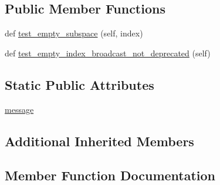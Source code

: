 \subsection*{Public Member Functions}
\begin{DoxyCompactItemize}
\item 
def \hyperlink{classnumpy_1_1core_1_1tests_1_1test__deprecations_1_1TestIncorrectAdvancedIndexWithEmptyResult_af973ee4d2cab6b1620e0ed1547ecb5d1}{test\+\_\+empty\+\_\+subspace} (self, index)
\item 
def \hyperlink{classnumpy_1_1core_1_1tests_1_1test__deprecations_1_1TestIncorrectAdvancedIndexWithEmptyResult_ad6c9a98d5ebc1620097f756fa0fdcf9d}{test\+\_\+empty\+\_\+index\+\_\+broadcast\+\_\+not\+\_\+deprecated} (self)
\end{DoxyCompactItemize}
\subsection*{Static Public Attributes}
\begin{DoxyCompactItemize}
\item 
\hyperlink{classnumpy_1_1core_1_1tests_1_1test__deprecations_1_1TestIncorrectAdvancedIndexWithEmptyResult_a4231e9ce75c57fe3f4418a15938a2ad2}{message}
\end{DoxyCompactItemize}
\subsection*{Additional Inherited Members}


\subsection{Member Function Documentation}
\mbox{\label{classnumpy_1_1core_1_1tests_1_1test__deprecations_1_1TestIncorrectAdvancedIndexWithEmptyResult_ad6c9a98d5ebc1620097f756fa0fdcf9d}} 

